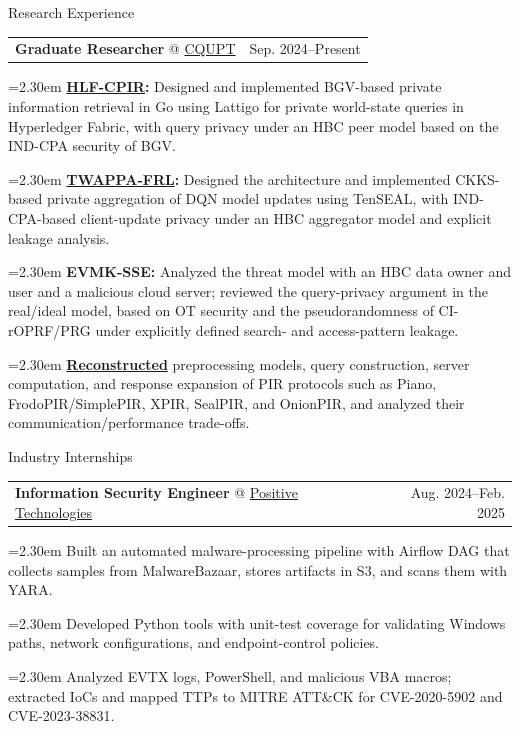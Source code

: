 \documentclass[11pt,a4paper]{article}
\makeatletter
\newcommand{\cvrow}[2]{%
  \noindent
  \begin{minipage}[t]{0.145\textwidth}
    \vspace{0pt}%
    \raggedright
    \fontsize{10.5}{12.5}\selectfont
    #1
  \end{minipage}%
  \hfill
  \begin{minipage}[t]{0.835\textwidth}
    \vspace{0pt}%
    #2
  \end{minipage}\par
}
\newcommand{\workentry}[2]{%
  \noindent
  \begin{tabularx}{\linewidth}
    {@{}X@{\hspace{0.8em}}r@{}}
    #1 & \small #2
  \end{tabularx}\par
  \vspace{0.15em}
}
\newcommand{\workproject}[1]{%
  \noindent
  \hangindent=2.30em
  \hangafter=1
  \hspace*{1.15em}\makebox[1.15em][l]{$\diamond$}#1\par
  \vspace{0.12em}
}
\makeatother
\begin{document}
\cvrow{Research Experience}{%
  \workentry
    {\textbf{Graduate Researcher} @
    \href{https://www.cqupt.edu.cn/}{CQUPT}}
    {Sep. 2024--Present}

  \workproject{\textbf{\href{https://github.com/iasenovets/2_2_HLF_CPIR}{HLF-CPIR}:}
  Designed and implemented BGV-based private information retrieval in Go using
  Lattigo for private world-state queries in Hyperledger Fabric,
  with query privacy under an HBC peer model based on the IND-CPA security of BGV.}

  \workproject{\textbf{\href{https://github.com/hetiantian10/TWAPPA-FRL}{TWAPPA-FRL}:}
  Designed the architecture and implemented CKKS-based
  private aggregation of DQN model updates using TenSEAL, with IND-CPA-based
  client-update privacy under an HBC aggregator model and explicit leakage analysis.}

  \workproject{\textbf{EVMK-SSE:} Analyzed the threat model with an HBC data owner
  and user and a malicious cloud server; reviewed the query-privacy argument in the
  real/ideal model, based on OT security and the pseudorandomness of CI-rOPRF/PRG under explicitly
  defined search- and access-pattern leakage.}



  \workproject{\textbf{\href{https://iasenovets.github.io/pir-schemes}{Reconstructed}}
  preprocessing models, query construction, server computation, and response expansion of PIR
  protocols such as Piano, FrodoPIR/SimplePIR, XPIR, SealPIR, and OnionPIR, and
  analyzed their communication/performance trade-offs.}
}

\vspace{0.50em}

\cvrow{Industry Internships}{%
  \workentry
    {\textbf{Information Security Engineer} @
    \href{https://global.ptsecurity.com/en/}{Positive Technologies}}
    {Aug. 2024--Feb. 2025}
  \workproject{Built an automated malware-processing pipeline with Airflow DAG that
  collects samples from MalwareBazaar, stores artifacts in S3, and scans them with YARA.}
  \workproject{Developed Python tools with unit-test coverage for validating
  Windows paths, network configurations, and endpoint-control policies.}
  \workproject{Analyzed EVTX logs, PowerShell, and malicious VBA macros; extracted
  IoCs and mapped TTPs to MITRE ATT\&CK for CVE-2020-5902 and CVE-2023-38831.}
}
\end{document}
